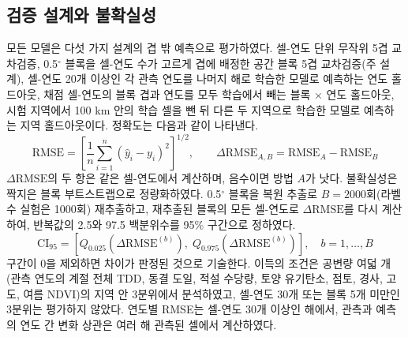 \subsection{검증 설계와 불확실성}
모든 모델은 다섯 가지 설계의 겹 밖 예측으로 평가하였다\cite{Roberts2017,Ploton2020}. 셀-연도 단위 무작위 5겹 교차검증, 0.5$^\circ$ 블록을 셀-연도 수가 고르게 겹에 배정한 공간 블록 5겹 교차검증(주 설계), 셀-연도 20개 이상인 각 관측 연도를 나머지 해로 학습한 모델로 예측하는 연도 홀드아웃, 채점 셀-연도의 블록 겹과 연도를 모두 학습에서 빼는 블록 × 연도 홀드아웃, 시험 지역에서 100 km 안의 학습 셀을 뺀 뒤 다른 두 지역으로 학습한 모델로 예측하는 지역 홀드아웃이다. 정확도는 다음과 같이 나타낸다.
\begin{equation}
\mathrm{RMSE} = \left[ \frac{1}{n} \sum_{i=1}^{n} \left( \hat{y}_i - y_i \right)^{2} \right]^{1/2}, \qquad \Delta\mathrm{RMSE}_{A,B} = \mathrm{RMSE}_{A} - \mathrm{RMSE}_{B}
\label{eq:rmse}
\end{equation}
$\Delta\mathrm{RMSE}$의 두 항은 같은 셀-연도에서 계산하며, 음수이면 방법 $A$가 낫다. 불확실성은 짝지은 블록 부트스트랩으로 정량화하였다. 0.5$^\circ$ 블록을 복원 추출로 $B=2000$회(라벨 수 실험은 1000회) 재추출하고, 재추출된 블록의 모든 셀-연도로 $\Delta\mathrm{RMSE}$를 다시 계산하여, 반복값의 2.5와 97.5 백분위수를 95\% 구간으로 정하였다.
\begin{equation}
\mathrm{CI}_{95} = \left[ Q_{0.025}\!\left( \Delta\mathrm{RMSE}^{(b)} \right),\; Q_{0.975}\!\left( \Delta\mathrm{RMSE}^{(b)} \right) \right], \quad b = 1,\ldots,B
\label{eq:ci}
\end{equation}
구간이 0을 제외하면 차이가 판정된 것으로 기술한다. 이득의 조건은 공변량 여덟 개(관측 연도의 계절 전체 TDD, 동결 도일, 적설 수당량, 토양 유기탄소, 점토, 경사, 고도, 여름 NDVI)의 지역 안 3분위에서 분석하였고, 셀-연도 30개 또는 블록 5개 미만인 3분위는 평가하지 않았다. 연도별 RMSE는 셀-연도 30개 이상인 해에서, 관측과 예측의 연도 간 변화 상관은 여러 해 관측된 셀에서 계산하였다.

